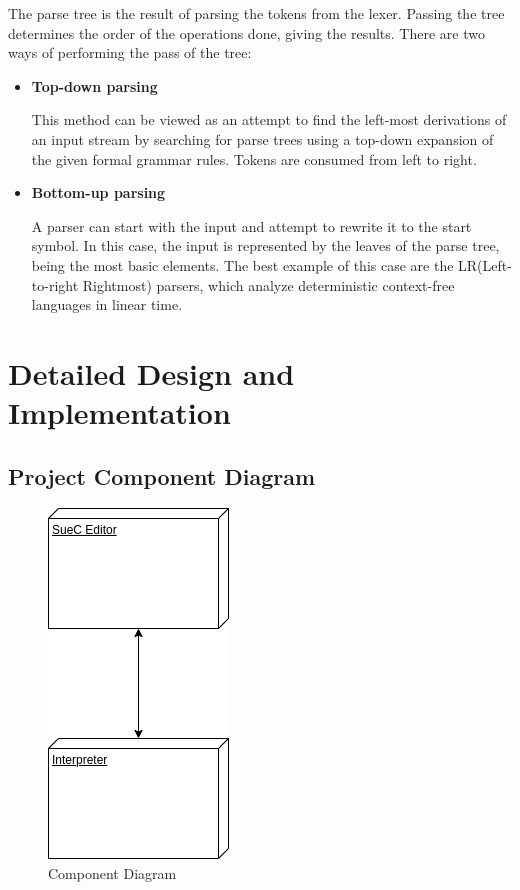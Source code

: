 \documentclass[12pt,a4paper,twoside]{report}
\begin{document}
 	The parse tree is the result of parsing the tokens from the lexer. Passing the tree determines the order of the operations done, giving the results. There are two ways of performing the pass of the tree:
 	
 	\begin{itemize}
 		\item \textbf{Top-down parsing}
 		
 		This method can be viewed as an attempt to find the left-most derivations of an input stream by searching for parse trees using a top-down expansion of the given formal grammar rules. Tokens are consumed from left to right.
 		
 		\item \textbf{Bottom-up parsing}
 		
 		A parser can start with the input and attempt to rewrite it to the start symbol. In this case, the input is represented by the leaves of the parse tree, being the most basic elements. The best example of this case are the LR(Left-to-right Rightmost) parsers, which analyze deterministic context-free languages in linear time.
 	\end{itemize}

\chapter{Detailed Design and Implementation}

\section{Project Component Diagram}
\begin{figure}[h]
 \centering
 \includegraphics[scale=0.6]{img/CompDiag.png}
 \caption{Component Diagram}
\end{figure}
\end{document}
